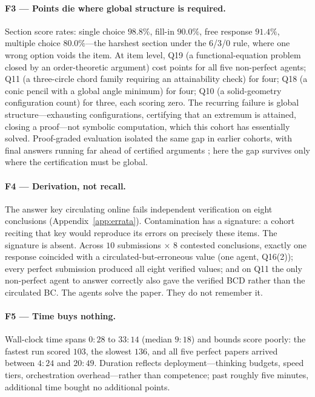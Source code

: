 \documentclass[11pt]{article}
\theoremstyle{plain}
\newcommand{\Q}[1]{Q#1}
\begin{document}
\paragraph{F3 --- Points die where global structure is required.}
Section score rates: single choice $98.8\%$, fill-in $90.0\%$, free
response $91.4\%$, multiple choice $80.0\%$---the harshest section under
the 6/3/0 rule, where one wrong option voids the item. At item level,
\Q{19} (a functional-equation problem closed by an order-theoretic
argument) cost points for all five non-perfect agents; \Q{11} (a
three-circle chord family requiring an attainability check) for four;
\Q{18} (a conic pencil with a global angle minimum) for four; \Q{10} (a
solid-geometry configuration count) for three, each scoring zero. The
recurring failure is global structure---exhausting configurations,
certifying that an extremum is attained, closing a proof---not symbolic
computation, which this cohort has essentially solved. Proof-graded
evaluation isolated the same gap in earlier cohorts, with final answers
running far ahead of certified arguments \citep{petrov2025proof}; here
the gap survives only where the certification must be global.

\paragraph{F4 --- Derivation, not recall.}
The answer key circulating online fails independent verification on eight
conclusions (Appendix~\ref{app:errata}). Contamination has a signature: a
cohort reciting that key would reproduce its errors on precisely these
items. The signature is absent. Across $10$ submissions $\times$ $8$
contested conclusions, exactly one response coincided with a
circulated-but-erroneous value (one agent, \Q{16}(2)); every perfect
submission produced all eight verified values; and on \Q{11} the only
non-perfect agent to answer correctly also gave the verified \textsf{BCD}
rather than the circulated \textsf{BC}. The agents solve the paper. They
do not remember it.

\paragraph{F5 --- Time buys nothing.}
Wall-clock time spans $0{:}28$ to $33{:}14$ (median $9{:}18$) and bounds
score poorly: the fastest run scored $103$, the slowest $136$, and all
five perfect papers arrived between $4{:}24$ and $20{:}49$. Duration
reflects deployment---thinking budgets, speed tiers, orchestration
overhead---rather than competence; past roughly five minutes, additional
time bought no additional points.
\end{document}
